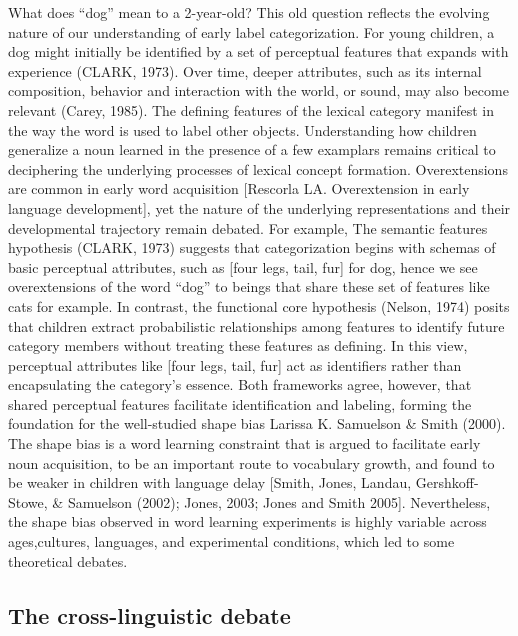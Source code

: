 \documentclass[10pt, letterpaper]{article}
\begin{document}
What does ``dog'' mean to a 2-year-old? This old question reflects the
evolving nature of our understanding of early label categorization. For
young children, a dog might initially be identified by a set of
perceptual features that expands with experience (CLARK, 1973). Over
time, deeper attributes, such as its internal composition, behavior and
interaction with the world, or sound, may also become relevant (Carey,
1985). The defining features of the lexical category manifest in the way
the word is used to label other objects. Understanding how children
generalize a noun learned in the presence of a few examplars remains
critical to deciphering the underlying processes of lexical concept
formation. Overextensions are common in early word acquisition
{[}Rescorla LA. Overextension in early language development{]}, yet the
nature of the underlying representations and their developmental
trajectory remain debated. For example, The semantic features hypothesis
(CLARK, 1973) suggests that categorization begins with schemas of basic
perceptual attributes, such as {[}four legs, tail, fur{]} for dog, hence
we see overextensions of the word ``dog'' to beings that share these set
of features like cats for example. In contrast, the functional core
hypothesis (Nelson, 1974) posits that children extract probabilistic
relationships among features to identify future category members without
treating these features as defining. In this view, perceptual attributes
like {[}four legs, tail, fur{]} act as identifiers rather than
encapsulating the category's essence. Both frameworks agree, however,
that shared perceptual features facilitate identification and labeling,
forming the foundation for the well-studied shape bias Larissa K.
Samuelson \& Smith (2000). The shape bias is a word learning constraint
that is argued to facilitate early noun acquisition, to be an important
route to vocabulary growth, and found to be weaker in children with
language delay {[}Smith, Jones, Landau, Gershkoff-Stowe, \& Samuelson
(2002); Jones, 2003; Jones and Smith 2005{]}. Nevertheless, the shape
bias observed in word learning experiments is highly variable across
ages,cultures, languages, and experimental conditions, which led to some
theoretical debates.

\hypertarget{the-cross-linguistic-debate}{%
\subsection{The cross-linguistic
debate}\label{the-cross-linguistic-debate}}
\end{document}

